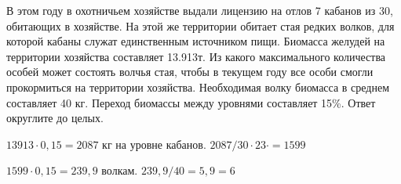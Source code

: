 
В этом году в охотничьем хозяйстве выдали лицензию на отлов 7 кабанов из 30, 
обитающих в хозяйстве. На этой же территории обитает стая редких волков, для 
которой кабаны служат единственным источником пищи. Биомасса желудей на территории 
хозяйства составляет 13.913т. Из какого максимального количества особей может состоять волчья 
стая, чтобы в текущем году все особи смогли прокормиться на территории хозяйства. 
Необходимая волку биомасса в среднем составляет 40 кг. Переход биомассы между уровнями составляет 15\%. 
Ответ округлите до целых.

\solutionSection

$13913 \cdot 0,15=2087$ кг на уровне кабанов. $2087/30 \cdot 23 \cdot =1599$   

$1599 \cdot 0,15=239,9$ волкам. $239,9/40 = 5,9 = 6$

